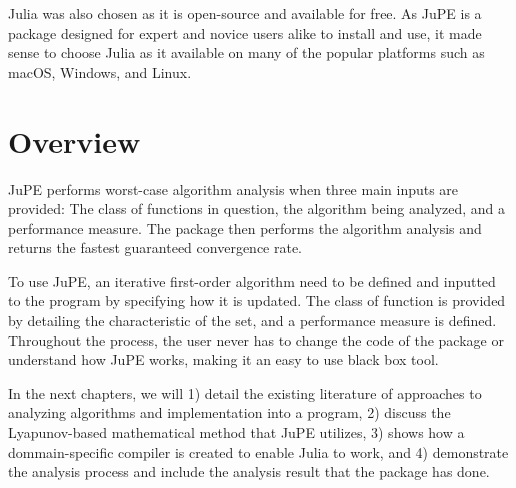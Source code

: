 Julia was also chosen as it is open-source and available for free. As JuPE is a package designed for expert and novice users alike to install and use, it made sense to choose Julia as it available on many of the popular platforms such as macOS, Windows, and Linux.

\section{Overview}

JuPE performs worst-case algorithm analysis when three main inputs are provided: The class of functions in question, the algorithm being analyzed, and a performance measure. The package then performs the algorithm analysis and returns the fastest guaranteed convergence rate.

To use JuPE, an iterative first-order algorithm need to be defined and inputted to the program by specifying how it is updated. The class of function is provided by detailing the characteristic of the set, and a performance measure is defined. Throughout the process, the user never has to change the code of the package or understand how JuPE works, making it an easy to use black box tool.

In the next chapters, we will 1) detail the existing literature of approaches to analyzing algorithms and implementation into a program, 2) discuss the Lyapunov-based mathematical method that JuPE utilizes, 3) shows how a dommain-specific compiler is created to enable Julia to work, and 4) demonstrate the analysis process and include the analysis result that the package has done.